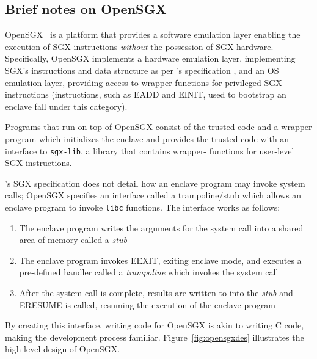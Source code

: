 \documentclass[../main.tex]{subfiles}
\begin{document}
	\subsection{Brief notes on OpenSGX}
	OpenSGX~\cite{opensgx} is a platform that provides a software emulation
	layer enabling the execution of SGX instructions \textit{without} the
	possession of SGX hardware. Specifically, OpenSGX implements a hardware
	emulation layer, implementing SGX's instructions and data structure as per
	\Intel's specification \footnotemark, and an OS emulation layer, providing
	access to wrapper functions for privileged SGX instructions (instructions,
	such as EADD and EINIT, used to bootstrap an enclave fall under this
	category)\footnotemark.

	Programs that run on top of OpenSGX consist of the trusted code and a
	wrapper program which initializes the enclave and provides the trusted code
	with an interface to \texttt{sgx-lib}, a library that contains wrapper-
	functions for user-level SGX instructions.

	\Intel's SGX specification does not detail how an enclave program may invoke system calls\footnotemark; OpenSGX specifies an interface called a 
	trampoline/stub which allows an enclave program to invoke \texttt{libc}
	functions. The interface works as follows:
	\begin{enumerate}
		\item The enclave program writes the arguments for the system call
		into a shared area of memory called a \textit{stub}
		\item The enclave program invokes EEXIT, exiting enclave mode, and
		executes a pre-defined handler called a \textit{trampoline} which
		invokes the system call
		\item After the system call is complete, results are written to
		into the \textit{stub} and ERESUME is called, resuming the execution of
		the enclave program
	\end{enumerate}
	By creating this interface, writing code for OpenSGX is akin to writing C
	code, making the development process familiar. Figure~\ref{fig:opensgxdes}
	illustrates the high level design of OpenSGX.
\end{document}
